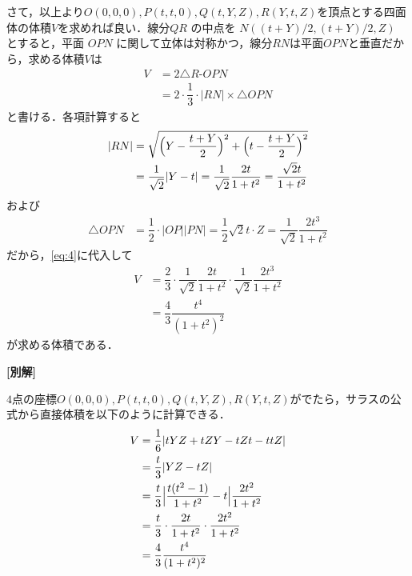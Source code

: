 \documentclass[../../main.tex]{subfiles}
\begin{document}
さて，以上より$O(0,0,0), P(t,t,0), Q(t,Y,Z), R(Y,t,Z)$を頂点とする四面体の体積$V$を求めれば良い．線分$QR$ の中点を $N((t+Y)/2,(t+Y)/2,Z)$ とすると，平面 $OPN$ に関して立体は対称かつ，線分$RN$は平面$OPN$と垂直だから，求める体積$V$は
\begin{align}
  V
  &= 2 \triangle R\text{-}OPN \\
  &= 2 \cdot \dfrac{1}{3} \cdot |RN| \times \triangle OPN \label{eq:4}
\end{align}
と書ける．各項計算すると
\begin{align}
  |RN|
  &= \sqrt{\Bigl(Y - \dfrac{t+Y}{2}\Bigr)^2 + \Bigl(t - \dfrac{t+Y}{2}\Bigr)^2} \\
  &= \dfrac{1}{\sqrt{2}} |Y - t| = \dfrac{1}{\sqrt{2}} \dfrac{2t}{1+t^2}
  = \dfrac{\sqrt{2}t}{1+t^2}
\end{align}
および
\begin{align}
  \triangle OPN
  &= \dfrac{1}{2} \cdot |OP| |PN| = \dfrac{1}{2} \sqrt{2}t \cdot Z = \dfrac{1}{\sqrt{2}} \dfrac{2t^3}{1+t^2}
\end{align}
だから，\cref{eq:4}に代入して
\begin{align}
  V
  &= \dfrac{2}{3} \cdot \dfrac{1}{\sqrt{2}} \dfrac{2t}{1+t^2} \cdot \dfrac{1}{\sqrt{2}} \dfrac{2t^3}{1+t^2} \\
  &= \dfrac{4}{3} \dfrac{t^4}{(1+t^2)^2}
\end{align}
が求める体積である．

{\bf [別解]}

$4$点の座標$O(0,0,0), P(t,t,0), Q(t,Y,Z), R(Y,t,Z)$がでたら，サラスの公式から直接体積を以下のように計算できる．
\begin{align}
  V &= \dfrac{1}{6} |t Y Z + t Z Y - t Z t - t t Z| \\
  &= \dfrac{t}{3} |Y Z - t Z| \\
  &= \dfrac{t}{3} \Bigl| \dfrac{t(t^2-1)}{1+t^2} - t \Bigr| \dfrac{2t^2}{1+t^2} \\
  &= \dfrac{t}{3} \cdot \dfrac{2t}{1+t^2} \cdot \dfrac{2t^2}{1+t^2} \\
  &= \dfrac{4}{3} \dfrac{t^4}{(1+t^2)^2}
\end{align}


\newpage
\end{document}
